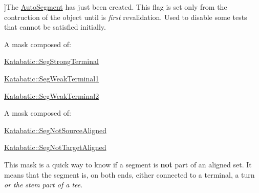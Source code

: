 \begin{Desc}
\begin{description}
{}]The \hyperlink{classKatabatic_1_1AutoSegment}{Auto\-Segment} has just been created. This flag is set only from the contruction of the object until is {\itshape first} revalidation. Used to disable some tests that cannot be satisfied initially. \item[{\em 
\hypertarget{namespaceKatabatic_a94585537ee1724ea9315578ec54380f4a419e7722198b077c1f71d6c47e2fc2ab}{Seg\-Weak\-Terminal}\label{namespaceKatabatic_a94585537ee1724ea9315578ec54380f4a419e7722198b077c1f71d6c47e2fc2ab}
}]A mask composed of\-:
\begin{DoxyItemize}
\item \hyperlink{namespaceKatabatic_a94585537ee1724ea9315578ec54380f4a93251a6b8197685e2aaf77a760851557}{Katabatic\-::\-Seg\-Strong\-Terminal}
\item \hyperlink{namespaceKatabatic_a94585537ee1724ea9315578ec54380f4a7b3e09b8ab4cf676fd308535d7fba892}{Katabatic\-::\-Seg\-Weak\-Terminal1}
\item \hyperlink{namespaceKatabatic_a94585537ee1724ea9315578ec54380f4a32f77fa2da27348bcfc294a039efd766}{Katabatic\-::\-Seg\-Weak\-Terminal2} 
\end{DoxyItemize}\item[{\em 
\hypertarget{namespaceKatabatic_a94585537ee1724ea9315578ec54380f4a637e0426170a532feac45548e009325d}{Seg\-Not\-Aligned}\label{namespaceKatabatic_a94585537ee1724ea9315578ec54380f4a637e0426170a532feac45548e009325d}
}]A mask composed of\-:
\begin{DoxyItemize}
\item \hyperlink{namespaceKatabatic_a94585537ee1724ea9315578ec54380f4a286b96fc8ab2377a2caf92c82352b0c8}{Katabatic\-::\-Seg\-Not\-Source\-Aligned}
\item \hyperlink{namespaceKatabatic_a94585537ee1724ea9315578ec54380f4ac5042810c9268798def84444d31968ea}{Katabatic\-::\-Seg\-Not\-Target\-Aligned}
\end{DoxyItemize}

This mask is a quick way to know if a segment is {\bfseries not} part of an aligned set. It means that the segment is, on both ends, either connected to a terminal, a turn {\itshape or the stem part of a tee}. \end{description}
\end{Desc}
